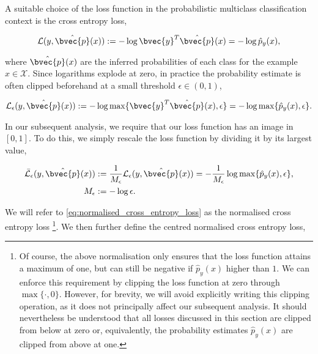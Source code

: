 \documentclass{article}
\begin{document}
		A suitable choice of the loss function in the probabilistic multiclass classification context is the cross entropy loss,
		
		\begin{equation}
			\mathcal{L}(y, \hat{\bvec{p}}(x)) := - \log{\bvec{y}^{T} \hat{\bvec{p}}(x)} = - \log{\hat{p}_{y}(x)},
		\end{equation}
		
		where $\hat{\bvec{p}}(x)$ are the inferred probabilities of each class for the example $x \in \mathcal{X}$. Since logarithms explode at zero, in practice the probability estimate is often clipped beforehand at a small threshold $\epsilon \in (0, 1)$,
		
		\begin{equation}
			\mathcal{L}_{\epsilon}(y, \hat{\bvec{p}}(x)) := - \log{\max \{\bvec{y}^{T} \hat{\bvec{p}}(x), \epsilon \} } = - \log{\max \{ \hat{p}_{y}(x), \epsilon \}}.
		\label{eq:cross_entropy_loss}
		\end{equation}
		
		In our subsequent analysis, we require that our loss function has an image in $[0, 1]$. To do this, we simply rescale the loss function by dividing it by its largest value,
		
		\begin{equation}
			\begin{aligned}
				\bar{\mathcal{L}}_{\epsilon}(y, \hat{\bvec{p}}(x)) &:= \frac{1}{M_{\epsilon}} \mathcal{L}_{\epsilon}(y, \hat{\bvec{p}}(x)) = - \frac{1}{M_{\epsilon}} \log{\max \{ \hat{p}_{y}(x), \epsilon \}}, \\
				M_{\epsilon} &:= - \log{\epsilon}.
			\end{aligned}
		\label{eq:normalised_cross_entropy_loss}
		\end{equation}
		
		We will refer to \eqref{eq:normalised_cross_entropy_loss} as the normalised cross entropy loss \footnote{Of course, the above normalisation only ensures that the loss function attains a maximum of one, but can still be negative if $\hat{p}_{y}(x)$ higher than $1$. We can enforce this requirement by clipping the loss function at zero through $\max\{\cdot, 0\}$. However, for brevity, we will avoid explicitly writing this clipping operation, as it does not principally affect our subsequent analysis. It should nevertheless be understood that all losses discussed in this section are clipped from below at zero or, equivalently, the probability estimates $\hat{p}_{y}(x)$ are clipped from above at one.}. We then further define the centred normalised cross entropy loss,
		
\end{document}
